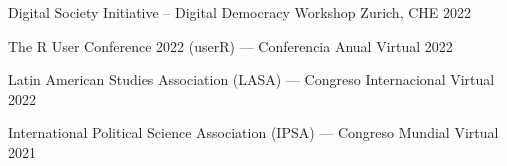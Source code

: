 
\begin{cvhonors}
\cvconf
{Digital Society Initiative -- Digital Democracy Workshop} 
{Zurich, CHE}
{2022}
\end{cvhonors}




\begin{cvhonors}
\cvconf
{The R User Conference 2022 (userR) --- Conferencia Anual} 
{Virtual}
{2022}
\end{cvhonors}

\begin{cvhonors}
\cvconf
{ Latin American Studies Association (LASA) --- Congreso Internacional} 
{Virtual}
{2022}
\end{cvhonors}




\begin{cvhonors}
\cvconf
{International Political Science Association (IPSA) --- Congreso Mundial} 
{Virtual}
{2021}
\end{cvhonors}


